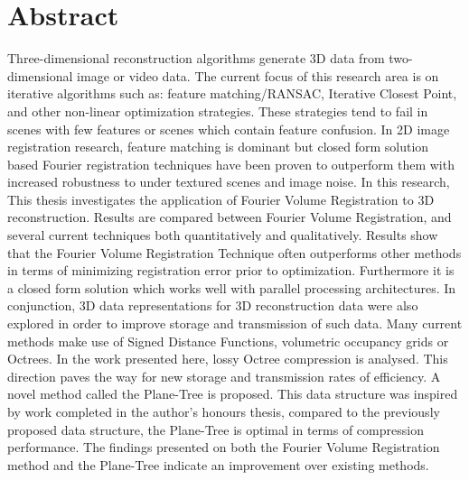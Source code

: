 \makeatletter
\chapter{Abstract}

Three-dimensional reconstruction algorithms generate 3D data from two-dimensional image or video data. The current focus of this research area is on iterative algorithms such as: feature matching/RANSAC, Iterative Closest Point, and other non-linear optimization strategies. These strategies tend to fail in scenes with few features or scenes which contain feature confusion. In 2D image registration research, feature matching is dominant but closed form solution based Fourier registration techniques have been proven to outperform them with increased robustness to under textured scenes and image noise. In this research, This thesis investigates the application of Fourier Volume Registration to 3D reconstruction. Results are compared between Fourier Volume Registration, and several current techniques both quantitatively and qualitatively. Results show that the Fourier Volume Registration Technique often outperforms other methods in terms of minimizing registration error prior to optimization. Furthermore it is a closed form solution which works well with parallel processing architectures. In conjunction, 3D data representations for 3D reconstruction data were also explored in order to improve storage and transmission of such data. Many current methods make use of Signed Distance Functions, volumetric occupancy grids or Octrees. In the work presented here, lossy Octree compression is analysed. This direction paves the way for new storage and transmission rates of efficiency. A novel method called the Plane-Tree is proposed. This data structure was inspired by work completed in the author's honours thesis, compared to the previously proposed data structure, the Plane-Tree is optimal in terms of compression performance. The findings presented on both the Fourier Volume Registration method and the Plane-Tree indicate an improvement over existing methods.


